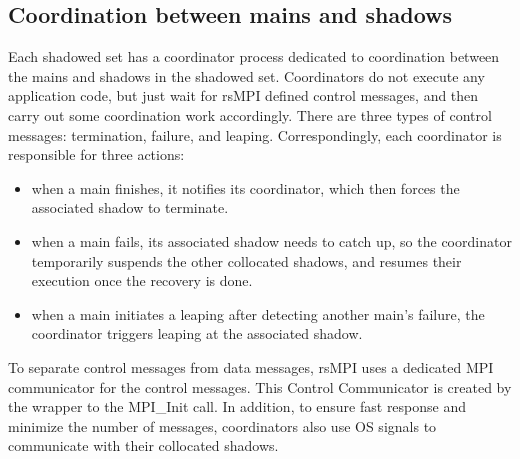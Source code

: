 \subsection{Coordination between mains and shadows}
Each shadowed set has a coordinator process dedicated to coordination between the mains and shadows in the shadowed set. 
Coordinators do not execute any application code, but just wait for rsMPI defined control messages, and then carry out some 
coordination work accordingly. There are three types of control messages: termination, failure, and leaping. Correspondingly, each coordinator is responsible for three actions:
\begin{itemize}
  \item when a main finishes, it notifies its coordinator, which then forces the associated shadow to terminate.
  \item when a main fails, its associated shadow needs to catch up, so the coordinator temporarily suspends the other collocated shadows, and resumes their execution once the recovery is done.
  \item when a main initiates a leaping after detecting another main's failure, the coordinator triggers leaping at the associated shadow.
\end{itemize}
To separate control messages from data messages, rsMPI uses a dedicated MPI communicator for the control messages. This Control Communicator is created by the wrapper to the MPI\_Init call. In addition, to ensure fast response and minimize the number of messages, coordinators also use OS signals to communicate with their collocated shadows. %

